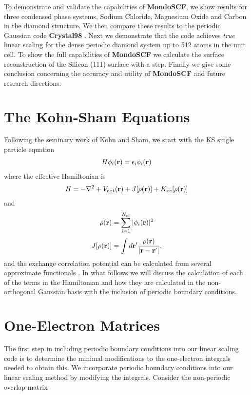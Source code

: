 \documentclass[prb,aps,nobibnotes,twocolumn,doublespace,twocolumngrid,superbib]{revtex4}
\begin{document}
To demonstrate and validate the capabilities of \textbf{MondoSCF}, we show results for 
three condensed phase systems, Sodium Chloride, Magnesium Oxide 
and Carbon in the diamond structure. We then compare these results to the periodic
Gaussian code \textbf{Crystal98} \cite{Crystal98}. Next we demonstrate that
the code achieves {\it true} linear scaling for the dense periodic diamond system 
up to 512 atoms in the unit cell.
%
%
To show the full capabilities of \textbf{MondoSCF} we calculate the surface reconstruction
of the Silicon (111) surface with a step.
%
Finally we give some conclusion concerning the accuracy and utility of \textbf{MondoSCF}
and future research directions.

\section{The Kohn-Sham Equations}

Following the seminary work of Kohn and Sham\cite{KohnSham65}, we start with the KS single 
particle equation
\begin{equation}
H \phi_{i}({\bf r})  = \epsilon_i \phi_{i}({\bf r})
\end{equation}
where the effective Hamiltonian is
\begin{equation}
H = -{\nabla}^{2}+ V_{ext}({\bf r}) + J[\rho({\bf r})] + K_{xc}[\rho({\bf r})]
\end{equation}
and
\begin{equation}
 \rho({\bf r}) = \sum_{i=1}^{N_{el}} | \phi_{i}({\bf r}) |^2
\end{equation}
\begin{equation}
 J[\rho({\bf r})] = \int d{\bf r'} {\rho({\bf r}) \over |{\bf r}-{\bf r'}|},
\end{equation}
and the exchange correlation potential can be calculated from several approximate
functionals
\cite{Becke93,Hertwig97,Bauschlicher95,Adamo00}. In what follows we will 
discuss the calculation of each of the terms in the Hamiltonian 
and how they are calculated in the non-orthogonal Gaussian basis
with the inclusion of periodic boundary conditions.

\section{One-Electron Matrices}

The first step in including periodic boundary conditions into our
linear scaling code is to determine the minimal modifications to the
one-electron integrals needed to obtain this. We incorporate periodic
boundary conditions into our linear scaling method by modifying the
integrals. Consider the non-periodic overlap matrix
\end{document}
